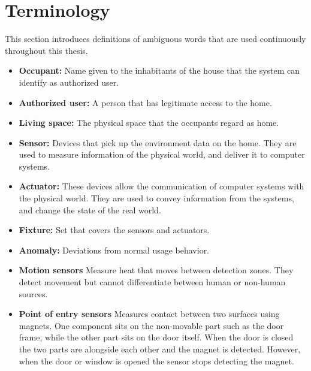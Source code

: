\begin{itemize}
%		
%		
%

		
%		
%		
%
%
		
	\end{itemize}


\section{Terminology}

This section introduces definitions of ambiguous words that are used continuously throughout this thesis. 

\begin{itemize}

\item \textbf{Occupant:} Name given to the inhabitants of the house that the system can identify as authorized user.

\item \textbf{Authorized user:} A person that has legitimate access to the home.

\item \textbf{Living space:} The physical space that the occupants regard as home.

\item \textbf{Sensor:} Devices that pick up the environment data on the home. They are used to measure information of the physical world, and deliver it to computer systems.

\item \textbf{Actuator:} These devices allow the communication of computer systems with the physical world. They are used to convey information from the systems, and change the state of the real world.

\item \textbf{Fixture:} Set that covers the sensors and actuators.

\item \textbf{Anomaly:} Deviations from normal usage behavior.

\item \textbf{Motion sensors} Measure heat that moves between detection zones. They detect movement but cannot differentiate between human or non-human sources. 

\item \textbf{Point of entry sensors} Measures contact between two surfaces using magnets. One component sits on the non-movable part such as the door frame, while the other part sits on the door itself. When the door is closed the two parts are alongside each other and the magnet is detected. However, when the door or window is opened the sensor stops detecting the magnet. 


\end{itemize}
